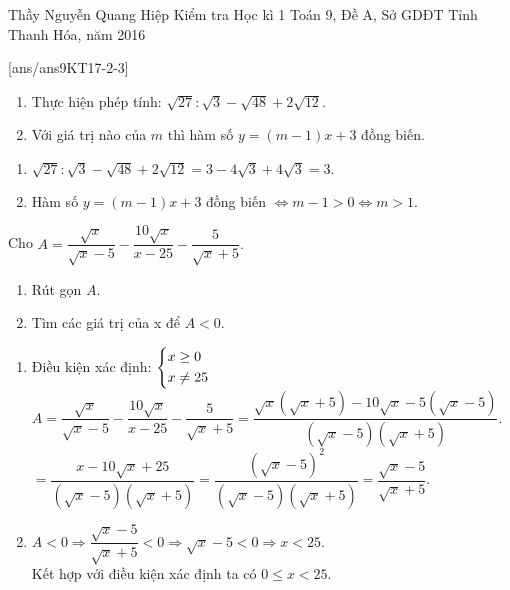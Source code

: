 \begin{name}
{Thầy  Nguyễn Quang Hiệp}
{Kiểm tra Học kì 1 Toán 9, Đề A, Sở GDĐT Tỉnh Thanh Hóa, năm 2016}
\end{name}

\setcounter{ex}{0}
[ans/ans9KT17-2-3]

\begin{ex}%
	\hfill
    \begin{enumerate}
    	\item Thực hiện phép tính: $\sqrt{27}:\sqrt{3}-\sqrt{48}+2\sqrt{12}.$
    	\item Với giá trị nào của $ m $ thì hàm số $y = (m-1)x + 3 $ đồng biến. 
    \end{enumerate}
\loigiai
    {
    	\begin{enumerate}
    		\item $ \sqrt{27}:\sqrt{3}-\sqrt{48}+2\sqrt{12}=3-4\sqrt{3}+4\sqrt{3}=3. $
    		\item Hàm số $ y=(m-1)x+3$ đồng biến $ \Leftrightarrow m-1>0 \Leftrightarrow m>1. $	
    \end{enumerate}
    
    }
\end{ex}

\begin{ex}%
    Cho $A=\dfrac{\sqrt{x}}{\sqrt{x}-5}-\dfrac{10\sqrt{x}}{x-25}-\dfrac{5}{\sqrt{x}+5}.$ 
    \begin{enumerate}
    	\item Rút gọn $A.$
    	\item Tìm các giá trị của x để $A < 0.$
    \end{enumerate}
    
\loigiai
    {\begin{enumerate}
    		\item Điều kiện xác định: $ \left\{\begin{aligned}&x \geq 0 \\ &x \neq 25\end{aligned}\right. $\\
    		$A=\dfrac{\sqrt{x}}{\sqrt{x}-5}-\dfrac{10\sqrt{x}}{x-25}-\dfrac{5}{\sqrt{x}+5} =\dfrac{\sqrt{x}(\sqrt{x}+5)-10\sqrt{x}-5(\sqrt{x}-5)}{
    			(\sqrt{x}-5)(\sqrt{x}+5)}.$\\
    		$ =\dfrac{x-10\sqrt{x}+25}{(\sqrt{x}-5)(\sqrt{x}+5)}=\dfrac{(\sqrt{x}-5)^2}{(\sqrt{x}-5)(\sqrt{x}+5)}=\dfrac{\sqrt{x}-5}{\sqrt{x}+5}. $
    		\item $ A<0 \Rightarrow \dfrac{\sqrt{x}-5}{\sqrt{x}+5}<0 \Rightarrow \sqrt{x}-5<0 \Rightarrow x<25. $\\
    		Kết hợp với điều kiện xác định ta có $ 0 \leq x <25. $
    	\end{enumerate}
    
    }
\end{ex}


